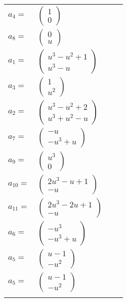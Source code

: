 \documentclass[1p]{elsarticle_modified}
\theoremstyle{definition}
\begin{document}
\begin{tabular}{m{7pt} m{180pt} m{7pt} m{180pt} }
\flushright $a_{4}=$&$\begin{pmatrix}1\\0\end{pmatrix}$ \\
\flushright $a_{8}=$&$\begin{pmatrix}0\\u\end{pmatrix}$ \\
\flushright $a_{1}=$&$\begin{pmatrix}u^3- u^2+1\\u^3- u\end{pmatrix}$ \\
\flushright $a_{3}=$&$\begin{pmatrix}1\\u^2\end{pmatrix}$ \\
\flushright $a_{2}=$&$\begin{pmatrix}u^3- u^2+2\\u^3+u^2- u\end{pmatrix}$ \\
\flushright $a_{7}=$&$\begin{pmatrix}- u\\- u^3+u\end{pmatrix}$ \\
\flushright $a_{9}=$&$\begin{pmatrix}u^3\\0\end{pmatrix}$ \\
\flushright $a_{10}=$&$\begin{pmatrix}2 u^3- u+1\\- u\end{pmatrix}$ \\
\flushright $a_{11}=$&$\begin{pmatrix}2 u^3-2 u+1\\- u\end{pmatrix}$ \\
\flushright $a_{6}=$&$\begin{pmatrix}- u^3\\- u^3+u\end{pmatrix}$ \\
\flushright $a_{5}=$&$\begin{pmatrix}u-1\\- u^2\end{pmatrix}$\\ \flushright $a_{5}=$&$\begin{pmatrix}u-1\\- u^2\end{pmatrix}$\\&\end{tabular}
\end{document}
